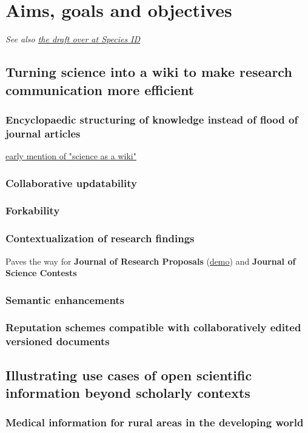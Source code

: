 \documentclass[final,authoryear,3p]{elsarticle-open-drafting}
\begin{document}
\section{Aims, goals and objectives}
{\it See also \href{http://species-id.net/wiki/Draft:Encyclopaedia_of_original_research#Aims,_Goals_and_Objectives}{the draft over at Species ID}}

\subsection{Turning science into a wiki to make research communication more efficient}
\subsubsection{Encyclopaedic structuring of knowledge instead of flood of journal articles}

\href{http://opencontract.org/}{early mention of "science as a wiki"}

\subsubsection{Collaborative updatability}
\subsubsection{Forkability}
\subsubsection{Contextualization of research findings}
Paves the way for {\bf Journal of Research Proposals} (\href{http://iphylo.blogspot.com/2011/06/would-you-give-me-grant-experiment-in.html}{demo}) and {\bf Journal of Science Contests}

\subsubsection{Semantic enhancements}
\subsubsection{Reputation schemes compatible with collaboratively edited versioned documents}
\subsection{Illustrating use cases of open scientific information beyond scholarly contexts}
\subsubsection{Medical information for rural areas in the developing world}
\end{document}
